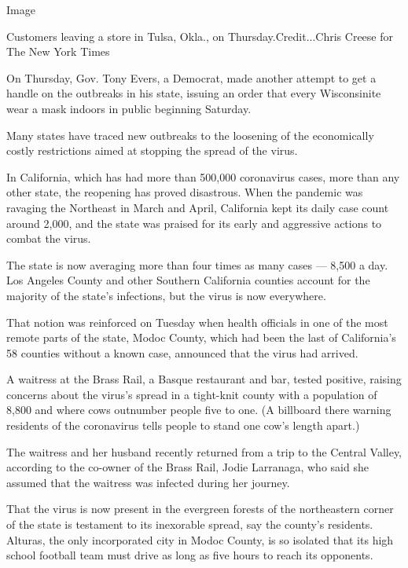 Image

Customers leaving a store in Tulsa, Okla., on Thursday.Credit...Chris
Creese for The New York Times

On Thursday, Gov. Tony Evers, a Democrat, made another attempt to get a
handle on the outbreaks in his state, issuing an order that every
Wisconsinite wear a mask indoors in public beginning Saturday.

Many states have traced new outbreaks to the loosening of the
economically costly restrictions aimed at stopping the spread of the
virus.

In California, which has had more than 500,000 coronavirus cases, more
than any other state, the reopening has proved disastrous. When the
pandemic was ravaging the Northeast in March and April, California kept
its daily case count around 2,000, and the state was praised for its
early and aggressive actions to combat the virus.

The state is now averaging more than four times as many cases --- 8,500
a day. Los Angeles County and other Southern California counties account
for the majority of the state's infections, but the virus is now
everywhere.

That notion was reinforced on Tuesday when health officials in one of
the most remote parts of the state, Modoc County, which had been the
last of California's 58 counties without a known case, announced that
the virus had arrived.

A waitress at the Brass Rail, a Basque restaurant and bar, tested
positive, raising concerns about the virus's spread in a tight-knit
county with a population of 8,800 and where cows outnumber people five
to one. (A billboard there warning residents of the coronavirus tells
people to stand one cow's length apart.)

The waitress and her husband recently returned from a trip to the
Central Valley, according to the co-owner of the Brass Rail, Jodie
Larranaga, who said she assumed that the waitress was infected during
her journey.

That the virus is now present in the evergreen forests of the
northeastern corner of the state is testament to its inexorable spread,
say the county's residents. Alturas, the only incorporated city in Modoc
County, is so isolated that its high school football team must drive as
long as five hours to reach its opponents.

\href{https://www.nytimes3xbfgragh.onion/news-event/coronavirus?action=click\&pgtype=Article\&state=default\&region=MAIN_CONTENT_3\&context=storylines_faq}{}

